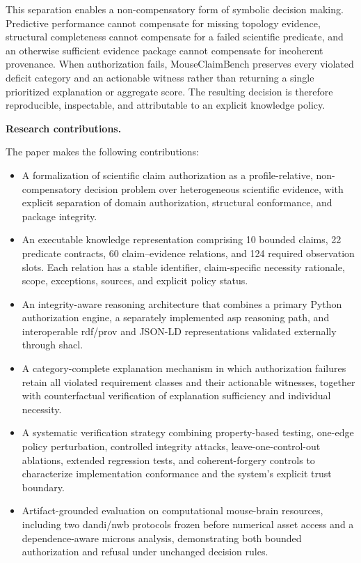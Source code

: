 \documentclass[11pt,a4paper]{article}
\begin{document}
This separation enables a non-compensatory form of symbolic decision making.
Predictive performance cannot compensate for missing topology evidence,
structural completeness cannot compensate for a failed scientific predicate,
and an otherwise sufficient evidence package cannot compensate for incoherent
provenance. When authorization fails, MouseClaimBench preserves every
violated deficit category and an actionable witness rather than returning a
single prioritized explanation or aggregate score. The resulting decision is
therefore reproducible, inspectable, and attributable to an explicit
knowledge policy.

\noindent\textbf{Research contributions.}\label{sec:contributions}\par
The paper makes the following contributions:
\begin{itemize}

    \item A formalization of scientific claim authorization as a
    profile-relative, non-compensatory decision problem over heterogeneous
    scientific evidence, with explicit separation of domain authorization,
    structural conformance, and package integrity.

    \item An executable knowledge representation comprising 10 bounded
    claims, 22 predicate contracts, 60 claim--evidence relations, and 124
    required observation slots. Each relation has a stable identifier,
    claim-specific necessity rationale, scope, exceptions, sources, and
    explicit policy status.

    \item An integrity-aware reasoning architecture that combines a primary
    Python authorization engine, a separately implemented \ac{asp} reasoning
    path, and interoperable \ac{rdf}/\ac{prov} and JSON-LD representations
    validated externally through \ac{shacl}.

    \item A category-complete explanation mechanism in which authorization
    failures retain all violated requirement classes and their actionable
    witnesses, together with counterfactual verification of explanation
    sufficiency and individual necessity.

    \item A systematic verification strategy combining property-based
    testing, one-edge policy perturbation, controlled integrity attacks,
    leave-one-control-out ablations, extended regression tests, and
    coherent-forgery controls to characterize implementation conformance and
    the system's explicit trust boundary.

    \item Artifact-grounded evaluation on computational mouse-brain resources,
    including two \ac{dandi}/\ac{nwb} protocols frozen before numerical asset
    access and a dependence-aware \ac{microns} analysis, demonstrating both
    bounded authorization and refusal under unchanged decision rules.

\end{itemize}
\end{document}
